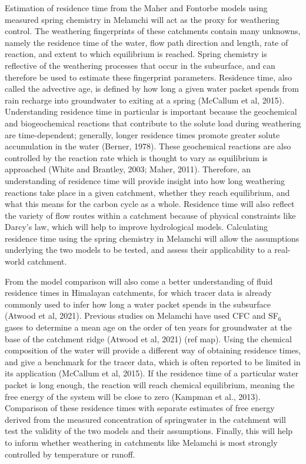 \bsk

Estimation of residence time from the Maher and Fontorbe models using measured spring chemistry in Melamchi will act as the proxy for weathering control. The weathering fingerprints of these catchments contain many unknowns, namely the residence time of the water, flow path direction and length, rate of reaction, and extent to which equilibrium is reached. Spring chemistry is reflective of the weathering processes that occur in the subsurface, and can therefore be used to estimate these fingerprint parameters. Residence time, also called the advective age, is defined by how long a given water packet spends from rain recharge into groundwater to exiting at a spring (McCallum et al, 2015). Understanding residence time in particular is important because the geochemical and biogeochemical reactions that contribute to the solute load during weathering are time-dependent; generally, longer residence times promote greater solute accumulation in the water (Berner, 1978). These geochemical reactions are also controlled by the reaction rate which is thought to vary as equilibrium is approached (White and Brantley, 2003; Maher, 2011). Therefore, an understanding of residence time will provide insight into how long weathering reactions take place in a given catchment, whether they reach equilibrium, and what this means for the carbon cycle as a whole. Residence time will also reflect the variety of flow routes within a catchment because of physical constraints like Darcy's law, which will help to improve hydrological models. Calculating residence time using the spring chemistry in Melamchi will allow the assumptions underlying the two models to be tested, and assess their applicability to a real-world catchment.

\bsk

From the model comparison will also come a better understanding of fluid residence times in Himalayan catchments, for which tracer data is already commonly used to infer how long a water packet spends in the subsurface (Atwood et al, 2021). Previous studies on Melamchi have used CFC and SF$_6$ gases to determine a mean age on the order of ten years for groundwater at the base of the catchment ridge (Atwood et al, 2021) (ref map). Using the chemical composition of the water will provide a different way of obtaining residence times, and give a benchmark for the tracer data, which is often reported to be limited in its application (McCallum et al, 2015). If the residence time of a particular water packet is long enough, the reaction will reach chemical equilibrium, meaning the free energy of the system will be close to zero (Kampman et al., 2013). Comparison of these residence times with separate estimates of free energy derived from the measured concentration of springwater in the catchment will test the validity of the two models and their assumptions. Finally, this will help to inform whether weathering in catchments like Melamchi is most strongly controlled by temperature or runoff.

